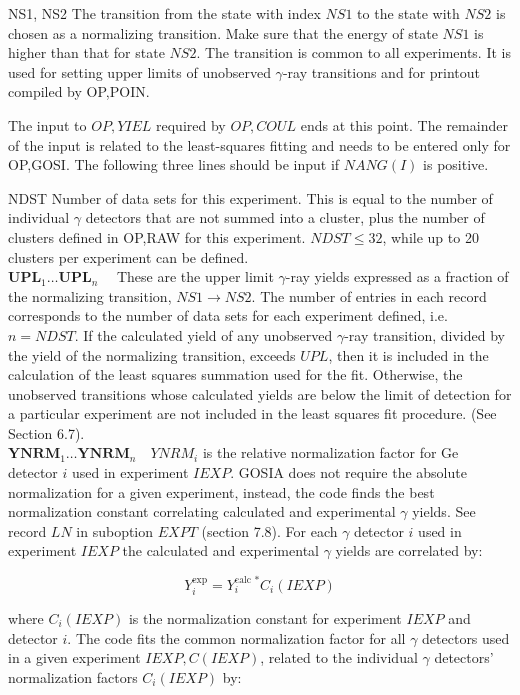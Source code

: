 \documentclass[10pt]{article}
\begin{document}
NS1, NS2 The transition from the state with index $N S 1$ to the state with $N S 2$ is chosen as a normalizing transition. Make sure that the energy of state $N S 1$ is higher than that for state $N S 2$. The transition is common to all experiments. It is used for setting upper limits of unobserved $\gamma$-ray transitions and for printout compiled by OP,POIN.

The input to $O P, Y I E L$ required by $O P, C O U L$ ends at this point. The remainder of the input is related to the least-squares fitting and needs to be entered only for OP,GOSI. The following three lines should be input if $N A N G(I)$ is positive.

NDST Number of data sets for this experiment. This is equal to the number of individual $\gamma$ detectors that are not summed into a cluster, plus the number of clusters defined in OP,RAW for this experiment. $N D S T \leq 32$, while up to 20 clusters per experiment can be defined.\\
$\mathbf{U P L}_{1} \ldots \mathbf{U P L}_{n} \quad$ These are the upper limit $\gamma$-ray yields expressed as a fraction of the normalizing transition, $N S 1 \rightarrow N S 2$. The number of entries in each record corresponds to the number of data sets for each experiment defined, i.e. $n=N D S T$. If the calculated yield of any unobserved $\gamma$-ray transition, divided by the yield of the normalizing transition, exceeds $U P L$, then it is included in the calculation of the least squares summation used for the fit. Otherwise, the unobserved transitions whose calculated yields are below the limit of detection for a particular experiment are not included in the least squares fit procedure. (See Section 6.7).\\
$\mathbf{Y N R M}_{1} \ldots \mathbf{Y N R M}_{n} \quad Y N R M_{i}$ is the relative normalization factor for Ge detector $i$ used in experiment $I E X P$. GOSIA does not require the absolute normalization for a given experiment, instead, the code finds the best normalization constant correlating calculated and experimental $\gamma$ yields. See record $L N$ in suboption $E X P T$ (section 7.8). For each $\gamma$ detector $i$ used in experiment $I E X P$ the calculated and experimental $\gamma$ yields are correlated by:

$$
Y_{i}^{\exp }=Y_{i}^{\text {calc } *} C_{i}(I E X P)
$$

where $C_{i}(I E X P)$ is the normalization constant for experiment $I E X P$ and detector $i$. The code fits the common normalization factor for all $\gamma$ detectors used in a given experiment $I E X P, C(I E X P)$, related to the individual $\gamma$ detectors' normalization factors $C_{i}(I E X P)$ by:
\end{document}
